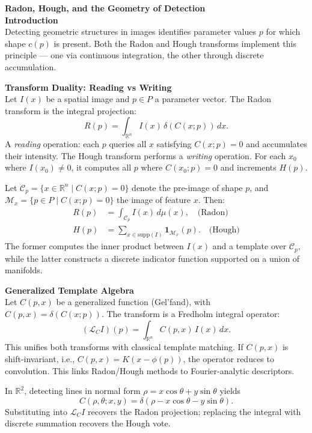 \begin{technical}
{\Large\textbf{Radon, Hough, and the Geometry of Detection}}\\[0.7em]

\textbf{Introduction}\\[0.5em]
Detecting geometric structures in images identifies parameter values $p$ for which shape $c(p)$ is present. Both the Radon and Hough transforms implement this principle — one via continuous integration, the other through discrete accumulation.

\textbf{Transform Duality: Reading vs Writing}\\[0.5em]
Let $I(x)$ be a spatial image and $p \in P$ a parameter vector. The Radon transform is the integral projection:
\[
R(p) = \int_{\mathbb{R}^n} I(x)\, \delta(C(x; p))\, dx.
\]
A \emph{reading} operation: each $p$ queries all $x$ satisfying $C(x; p) = 0$ and accumulates their intensity. The Hough transform performs a \emph{writing} operation. For each $x_0$ where $I(x_0) \ne 0$, it computes all $p$ where $C(x_0; p) = 0$ and increments $H(p)$.

Let $\mathcal{C}_p = \{x \in \mathbb{R}^n \mid C(x; p) = 0\}$ denote the pre-image of shape $p$, and $\mathcal{M}_x = \{p \in P \mid C(x; p) = 0\}$ the image of feature $x$. Then:
\begin{align*}
R(p) &= \int_{\mathcal{C}_p} I(x)\, d\mu(x), \quad \text{(Radon)}\\
H(p) &= \sum_{x \in \mathrm{supp}(I)} \mathbf{1}_{\mathcal{M}_x}(p). \quad \text{(Hough)}
\end{align*}
The former computes the inner product between $I(x)$ and a template over $\mathcal{C}_p$, while the latter constructs a discrete indicator function supported on a union of manifolds.

\textbf{Generalized Template Algebra}\\[0.5em]
Let $C(p,x)$ be a generalized function (Gel'fand), with $C(p,x) = \delta(C(x; p))$. The transform is a Fredholm integral operator:
\[
(\mathcal{L}_C I)(p) = \int_{\mathbb{R}^n} C(p,x)\, I(x)\, dx.
\]
This unifies both transforms with classical template matching. If $C(p,x)$ is shift-invariant, i.e., $C(p,x) = K(x - \phi(p))$, the operator reduces to convolution. This links Radon/Hough methods to Fourier-analytic descriptors.

In $\mathbb{R}^2$, detecting lines in normal form $\rho = x\cos\theta + y\sin\theta$ yields
\[
C(\rho,\theta; x,y) = \delta(\rho - x\cos\theta - y\sin\theta).
\]
Substituting into $\mathcal{L}_C I$ recovers the Radon projection; replacing the integral with discrete summation recovers the Hough vote.


\end{technical}
